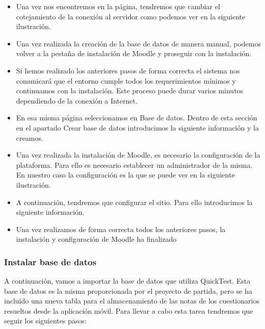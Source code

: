 \begin{itemize}
	\item Una vez nos encontremos en la página, tendremos que cambiar el cotejamiento de la conexión al servidor como podemos ver en la siguiente ilustración.
	
	\item Una vez realizada la creación de la base de datos de manera manual, podemos volver a la pestaña de instalación de Moodle y proseguir con la instalación.

	\item Si hemos realizado los anteriores pasos de forma correcta el sistema nos comunicará que el entorno cumple todos los requerimientos mínimos y continuamos con la instalación. Este proceso puede durar varios minutos dependiendo de la conexión a Internet.
	
	\item En esa misma página seleccionamos en Base de datos. Dentro de esta sección en el apartado Crear base de datos introducimos la siguiente información y la creamos. 
	
	\item Una vez realizada la instalación de Moodle, es necesario la configuración de la plataforma. Para ello es necesario establecer un administrador de la misma. En nuestro caso la configuración es la que se puede ver en la siguiente ilustración. 
	
	\item A continuación, tendremos que configurar el sitio. Para ello introducimos la siguiente información. 
	
	\item Una vez realizamos de forma correcta todos los anteriores pasos, la instalación y configuración de Moodle ha finalizado

\end{itemize}

\subsubsection{Instalar base de datos}

A continuación, vamos a importar la base de datos que utiliza QuickTest. Esta base de datos es la misma proporcionada por el proyecto de partida, pero se ha incluido una nueva tabla para el almacenamiento de las notas de los cuestionarios resueltos desde la aplicación móvil. Para llevar a cabo esta tarea tendremos que seguir los siguientes pasos:

